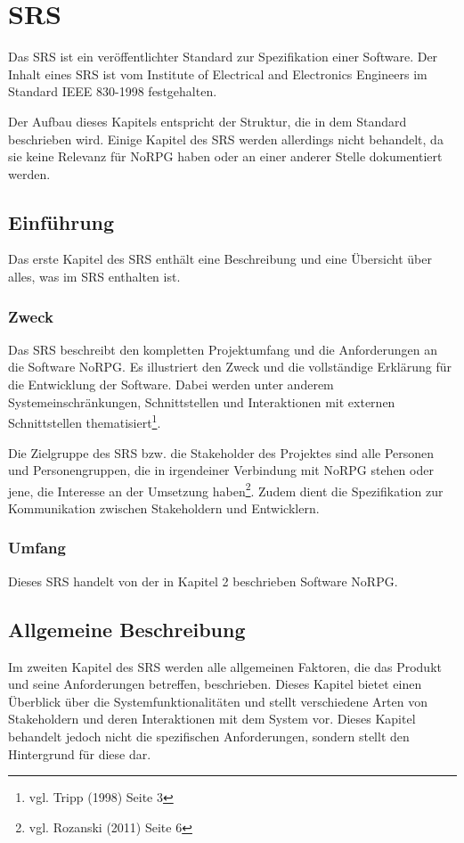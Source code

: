 \chapter{\acl{SRS}}
	Das \acf{SRS} ist ein veröffentlichter Standard zur Spezifikation einer Software. Der Inhalt eines \ac{SRS} ist vom Institute of Electrical and Electronics Engineers im Standard IEEE 830-1998 festgehalten.
	
	Der Aufbau dieses Kapitels entspricht der Struktur, die in dem Standard beschrieben wird. Einige Kapitel des SRS werden allerdings nicht behandelt, da sie keine Relevanz für NoRPG haben oder an einer anderer Stelle dokumentiert werden.
	
\section{Einführung}
	Das erste Kapitel des \ac{SRS} enthält eine Beschreibung und eine Übersicht über alles, was im \ac{SRS} enthalten ist.
	
	\subsection{Zweck}
		Das \ac{SRS} beschreibt den kompletten Projektumfang und die Anforderungen an die Software NoRPG. Es illustriert den Zweck und die vollständige Erklärung für die Entwicklung der Software. Dabei werden unter anderem Systemeinschränkungen, Schnittstellen und Interaktionen mit externen Schnittstellen thematisiert\footnote{vgl. Tripp \cite{srsIEEE}(1998) Seite 3}. 
	
		Die Zielgruppe des \ac{SRS} bzw. die Stakeholder des Projektes sind alle Personen und Personengruppen, die in irgendeiner Verbindung mit NoRPG stehen oder jene, die Interesse an der Umsetzung haben\footnote{vgl. Rozanski \cite{rozanski2011}(2011) Seite 6}. Zudem dient die Spezifikation zur Kommunikation zwischen Stakeholdern und Entwicklern.
		
	\subsection{Umfang}
		Dieses \ac{SRS} handelt von der in Kapitel 2 beschrieben Software NoRPG. 
		
\section{Allgemeine Beschreibung}
	Im zweiten Kapitel des \ac{SRS} werden alle allgemeinen Faktoren, die das Produkt und seine Anforderungen betreffen, beschrieben. Dieses Kapitel bietet einen Überblick über die Systemfunktionalitäten und stellt verschiedene Arten von Stakeholdern und deren Interaktionen mit dem System vor. Dieses Kapitel behandelt jedoch nicht die spezifischen Anforderungen, sondern stellt den Hintergrund für diese dar. 

